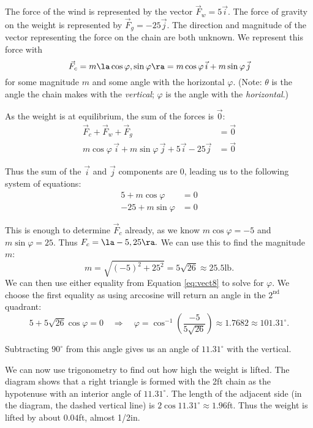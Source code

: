{The force of the wind is represented by the vector $\vec F_w = 5\vec i$. The force of gravity on the weight is represented by $\vec F_g = -25\vec j$. The direction and magnitude of the vector representing the force on the chain are both unknown. We represent this force with 
\[
\vec F_c = m\la \cos\varphi,\sin\varphi\ra = m\cos\varphi\, \vec i + m\sin\varphi\,\vec j
\]
for some magnitude $m$ and some angle with the horizontal $\varphi$. (Note: $\theta$ is the angle the chain makes with the \emph{vertical}; $\varphi$ is the angle with the \emph{horizontal}.)

As the weight is at equilibrium, the sum of the forces is $\vec0$:
\begin{align*}
\vec F_c + \vec F_w + \vec F_g &= \vec 0\\
m\cos\varphi\, \vec i + m\sin\varphi\,\vec j + 5\vec i - 25\vec j &=\vec 0
\end{align*}

 Thus the sum of the $\vec i$ and $\vec j$ components are 0, leading us to the following system of equations:
\begin{equation}
\begin{split}
5+m\cos\varphi &= 0\\
-25+m\sin\varphi &= 0
\end{split}\label{eq:vect8}
\end{equation}

This is enough to determine $\vec F_c$ already, as we know $m\cos \varphi = -5$ and $m\sin\varphi =25$. Thus $F_c = \la -5,25\ra.$ We can use this to find the magnitude $m$:
\[
m = \sqrt{(-5)^2+25^2} = 5\sqrt{26}\approx 25.5\text{lb}.
\]
We can then use either equality from Equation \eqref{eq:vect8} to solve for $\varphi$. We choose the first equality as using arccosine will return an angle in the $2^\text{nd}$ quadrant:
\[
5 + 5\sqrt{26}\cos \varphi = 0 \quad \Rightarrow \quad \varphi = \cos^{-1}\left(\frac{-5}{5\sqrt{26}}\right) \approx 1.7682\approx 101.31^\circ.
\]

Subtracting $90^\circ$ from this angle gives us an angle of $11.31^\circ$ with the vertical.

We can now use trigonometry to find out how high the weight is lifted. The diagram shows that a right triangle is formed with the 2ft chain as the hypotenuse with an interior angle of $11.31^\circ$. The length of the adjacent side (in the diagram, the dashed vertical line) is $2\cos 11.31^\circ \approx 1.96$ft. Thus the weight is lifted by about $0.04$ft, almost 1/2in.
}\\

